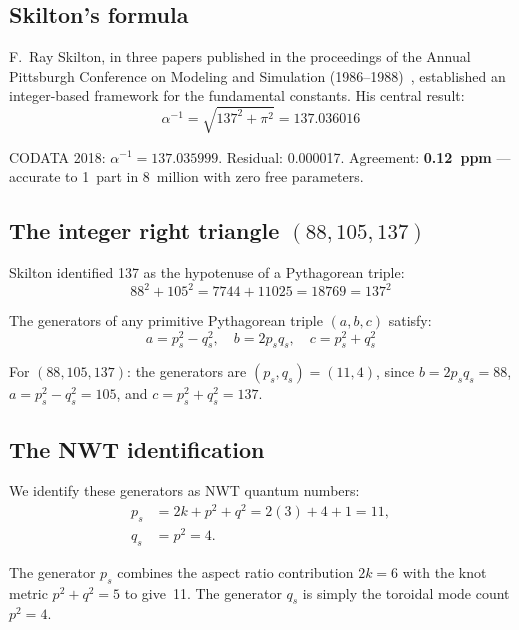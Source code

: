 \documentclass[11pt,a4paper]{article}
\begin{document}
\subsection{Skilton's formula}

F.~Ray Skilton, in three papers published in the proceedings of the Annual Pittsburgh Conference on Modeling and Simulation (1986--1988)~\cite{skilton1986,skilton1987,skilton1988}, established an integer-based framework for the fundamental constants. His central result:
\begin{equation}
  \alpha^{-1} = \sqrt{137^2 + \pi^2} = 137.036016
  \label{eq:skilton}
\end{equation}

CODATA 2018: $\alpha^{-1} = 137.035999$. Residual: 0.000017. Agreement: \textbf{0.12~ppm} --- accurate to 1~part in 8~million with zero free parameters.

\subsection{The integer right triangle $(88, 105, 137)$}

Skilton identified 137 as the hypotenuse of a Pythagorean triple:
\begin{equation}
  88^2 + 105^2 = 7744 + 11025 = 18769 = 137^2
\end{equation}

The generators of any primitive Pythagorean triple $(a, b, c)$ satisfy:
\begin{equation}
  a = p_s^2 - q_s^2, \quad b = 2p_s q_s, \quad c = p_s^2 + q_s^2
\end{equation}

For $(88, 105, 137)$: the generators are $(p_s, q_s) = (11, 4)$, since $b = 2 p_s q_s = 88$, $a = p_s^2 - q_s^2 = 105$, and $c = p_s^2 + q_s^2 = 137$.

\subsection{The NWT identification}

We identify these generators as NWT quantum numbers:
\begin{align}
  p_s &= 2k + p^2 + q^2 = 2(3) + 4 + 1 = 11, \label{eq:ps} \\
  q_s &= p^2 = 4. \label{eq:qs}
\end{align}

The generator $p_s$ combines the aspect ratio contribution $2k = 6$ with the knot metric $p^2 + q^2 = 5$ to give~11. The generator $q_s$ is simply the toroidal mode count $p^2 = 4$.
\end{document}
